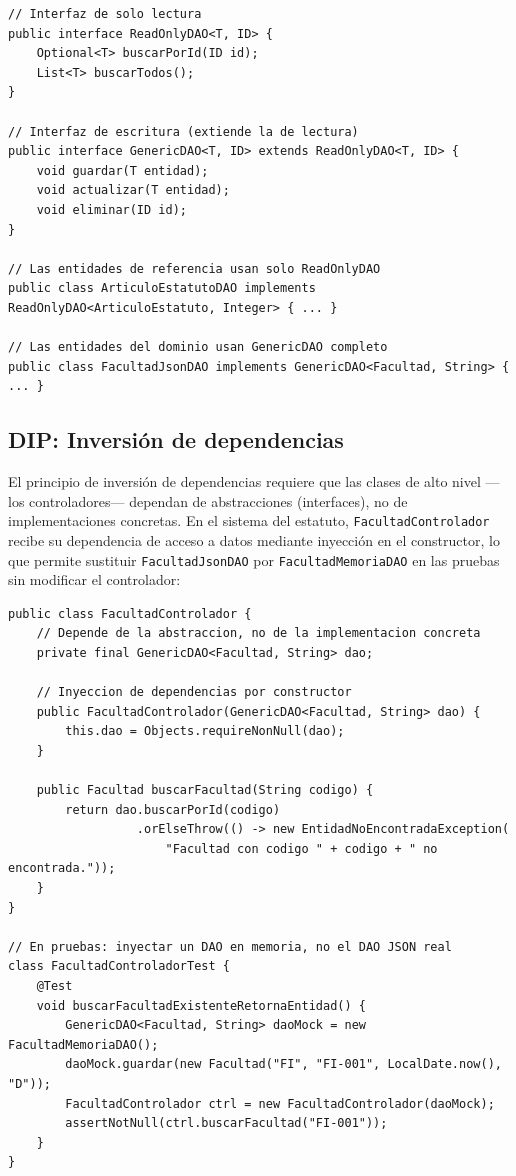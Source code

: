 \begin{lstlisting}[style=javaStyle,
  caption={Segregación de \texttt{GenericDAO} conforme al ISP.},
  label={lst:isp-segregacion}]
// Interfaz de solo lectura
public interface ReadOnlyDAO<T, ID> {
    Optional<T> buscarPorId(ID id);
    List<T> buscarTodos();
}

// Interfaz de escritura (extiende la de lectura)
public interface GenericDAO<T, ID> extends ReadOnlyDAO<T, ID> {
    void guardar(T entidad);
    void actualizar(T entidad);
    void eliminar(ID id);
}

// Las entidades de referencia usan solo ReadOnlyDAO
public class ArticuloEstatutoDAO implements ReadOnlyDAO<ArticuloEstatuto, Integer> { ... }

// Las entidades del dominio usan GenericDAO completo
public class FacultadJsonDAO implements GenericDAO<Facultad, String> { ... }
\end{lstlisting}

\subsection{DIP: Inversión de dependencias}
\label{subsec:solid-dip}

El principio de inversión de dependencias requiere que las clases de alto nivel ---los
controladores--- dependan de abstracciones (interfaces), no de implementaciones concretas.
En el sistema del estatuto, \texttt{FacultadControlador} recibe su dependencia de acceso
a datos mediante inyección en el constructor, lo que permite sustituir \texttt{FacultadJsonDAO}
por \texttt{FacultadMemoriaDAO} en las pruebas sin modificar el controlador:

\begin{lstlisting}[style=javaStyle,
  caption={DIP: controlador con dependencia inyectada sobre interfaz.},
  label={lst:dip-controlador}]
public class FacultadControlador {
    // Depende de la abstraccion, no de la implementacion concreta
    private final GenericDAO<Facultad, String> dao;

    // Inyeccion de dependencias por constructor
    public FacultadControlador(GenericDAO<Facultad, String> dao) {
        this.dao = Objects.requireNonNull(dao);
    }

    public Facultad buscarFacultad(String codigo) {
        return dao.buscarPorId(codigo)
                  .orElseThrow(() -> new EntidadNoEncontradaException(
                      "Facultad con codigo " + codigo + " no encontrada."));
    }
}

// En pruebas: inyectar un DAO en memoria, no el DAO JSON real
class FacultadControladorTest {
    @Test
    void buscarFacultadExistenteRetornaEntidad() {
        GenericDAO<Facultad, String> daoMock = new FacultadMemoriaDAO();
        daoMock.guardar(new Facultad("FI", "FI-001", LocalDate.now(), "D"));
        FacultadControlador ctrl = new FacultadControlador(daoMock);
        assertNotNull(ctrl.buscarFacultad("FI-001"));
    }
}
\end{lstlisting}


